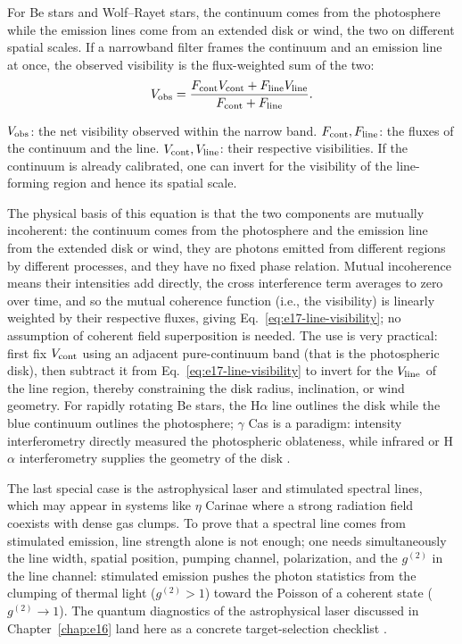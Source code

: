 For Be stars and Wolf--Rayet stars, the continuum comes from the photosphere while the emission lines come from an extended disk or wind, the two on different spatial scales. If a narrowband filter frames the continuum and an emission line at once, the observed visibility is the flux-weighted sum of the two:
\begin{equation}
  V_{\rm obs}=
  \frac{F_{\rm cont}V_{\rm cont}+F_{\rm line}V_{\rm line}}
       {F_{\rm cont}+F_{\rm line}} .
  \label{eq:e17-line-visibility}
\end{equation}
\begin{formulaexplain}
\(V_{\rm obs}\): the net visibility observed within the narrow band. \(F_{\rm cont},F_{\rm line}\): the fluxes of the continuum and the line. \(V_{\rm cont},V_{\rm line}\): their respective visibilities. If the continuum is already calibrated, one can invert for the visibility of the line-forming region and hence its spatial scale.
\end{formulaexplain}
The physical basis of this equation is that the two components are mutually incoherent: the continuum comes from the photosphere and the emission line from the extended disk or wind, they are photons emitted from different regions by different processes, and they have no fixed phase relation. Mutual incoherence means their intensities add directly, the cross interference term averages to zero over time, and so the mutual coherence function (i.e., the visibility) is linearly weighted by their respective fluxes, giving Eq.~\eqref{eq:e17-line-visibility}; no assumption of coherent field superposition is needed. The use is very practical: first fix \(V_{\rm cont}\) using an adjacent pure-continuum band (that is the photospheric disk), then subtract it from Eq.~\eqref{eq:e17-line-visibility} to invert for the \(V_{\rm line}\) of the line region, thereby constraining the disk radius, inclination, or wind geometry. For rapidly rotating Be stars, the H\(\alpha\) line outlines the disk while the blue continuum outlines the photosphere; \(\gamma\) Cas is a paradigm: intensity interferometry directly measured the photospheric oblateness, while infrared or H\(\alpha\) interferometry supplies the geometry of the disk \citep{2025ApJ...995..191A}.

The last special case is the astrophysical laser and stimulated spectral lines, which may appear in systems like \(\eta\) Carinae where a strong radiation field coexists with dense gas clumps. To prove that a spectral line comes from stimulated emission, line strength alone is not enough; one needs simultaneously the line width, spatial position, pumping channel, polarization, and the \(g^{(2)}\) in the line channel: stimulated emission pushes the photon statistics from the clumping of thermal light (\(g^{(2)}>1\)) toward the Poisson of a coherent state (\(g^{(2)}\to1\)). The quantum diagnostics of the astrophysical laser discussed in Chapter~\ref{chap:e16} land here as a concrete target-selection checklist \citep{2004A&A...428..497J,2005NewA...10..361J,2008AIPC..984..216D}.

